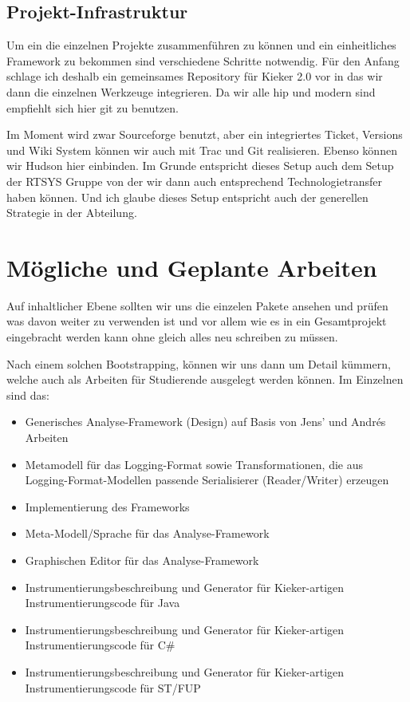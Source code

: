 \subsection{Projekt-Infrastruktur}

Um ein die einzelnen Projekte zusammenführen zu können und ein einheitliches Framework zu bekommen sind verschiedene Schritte notwendig. Für den Anfang schlage ich deshalb ein gemeinsames Repository für Kieker 2.0 vor in das wir dann die einzelnen Werkzeuge integrieren. Da wir alle hip und modern sind empfiehlt sich hier git zu benutzen.

Im Moment wird zwar Sourceforge benutzt, aber ein integriertes Ticket, Versions und Wiki System können wir auch mit Trac und Git realisieren. Ebenso können wir Hudson hier einbinden. Im Grunde entspricht dieses Setup auch dem Setup der RTSYS Gruppe von der wir dann auch entsprechend Technologietransfer haben können. Und ich glaube dieses Setup entspricht auch der generellen Strategie in der Abteilung.

\section{Mögliche und Geplante Arbeiten}

Auf inhaltlicher Ebene sollten wir uns die einzelen Pakete ansehen und prüfen was davon weiter zu verwenden ist und vor allem wie es in ein Gesamtprojekt eingebracht werden kann ohne gleich alles neu schreiben zu müssen.

Nach einem solchen Bootstrapping, können wir uns dann um Detail kümmern, welche auch als Arbeiten für Studierende ausgelegt werden können. Im Einzelnen sind das:

\begin{itemize}
\item Generisches Analyse-Framework (Design) auf Basis von Jens' und Andrés Arbeiten
\item Metamodell für das Logging-Format sowie Transformationen, die aus Logging-Format-Modellen passende Serialisierer (Reader/Writer) erzeugen 
\item Implementierung des Frameworks 
\item Meta-Modell/Sprache für das Analyse-Framework 
\item Graphischen Editor für das Analyse-Framework 
\item Instrumentierungsbeschreibung und Generator für Kieker-artigen Instrumentierungscode für Java 
\item Instrumentierungsbeschreibung und Generator für Kieker-artigen Instrumentierungscode für C\# 
\item Instrumentierungsbeschreibung und Generator für Kieker-artigen Instrumentierungscode für ST/FUP 
\end{itemize}

